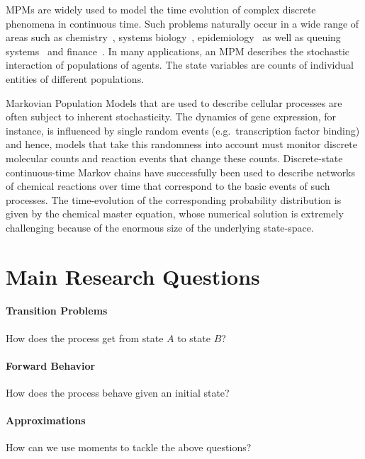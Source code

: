 
\Acp{MPM} are widely used to model the time evolution of complex 
discrete phenomena in continuous time. Such problems naturally occur in a wide range of areas such as chemistry~\parencite{gillespie1977exact}, systems biology~\parencite{wilkinson2018stochastic,BuchWolkenhauer}, epidemiology~\parencite{mode2000stochastic} as well as    queuing systems~\parencite{breuer2003markov} and finance~\parencite{pardoux2008markov}.
In many applications, an \ac{MPM} describes the stochastic interaction of populations of agents.
The state variables are counts of individual entities of different populations.


Markovian Population Models that are used to describe cellular processes are often subject to inherent stochasticity.
The dynamics of gene expression, for instance, is influenced by 
single random events (e.g.\ transcription factor binding) and 
hence, models that take this randomness into account must monitor
discrete molecular counts and reaction events that change these counts.
Discrete-state continuous-time Markov chains have successfully  been
used to describe  networks of chemical reactions
over time that correspond to the basic events of such processes. 
The time-evolution of the corresponding probability distribution is 
given by the chemical master equation, whose numerical solution is
extremely challenging because of the enormous size of the underlying
state-space. 

\section{Main Research Questions}
\paragraph{Transition Problems} How does the process get from state $A$ to state $B$?
\paragraph{Forward Behavior} How does the process behave given an initial state?
\paragraph{Approximations} How can we use moments to tackle the above questions?
